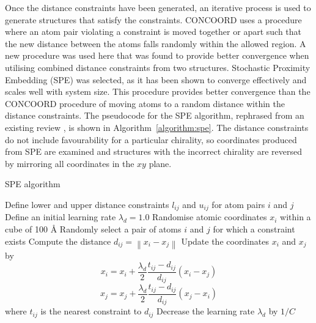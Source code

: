 Once the distance constraints have been generated, an iterative process is used to generate structures that satisfy the constraints.
CONCOORD uses a procedure where an atom pair violating a constraint is moved together or apart such that the new distance between the atoms falls randomly within the allowed region.
A new procedure was used here that was found to provide better convergence when utilising combined distance constraints from two structures.
Stochastic Proximity Embedding (SPE) \cite{Agrafiotis2013} was selected, as it has been shown to converge effectively and scales well with system size.
This procedure provides better convergence than the CONCOORD procedure of moving atoms to a random distance within the distance constraints.
The pseudocode for the SPE algorithm, rephrased from an existing review \cite{Agrafiotis2013}, is shown in Algorithm~\ref{algorithm:spe}.
The distance constraints do not include favourability for a particular chirality, so coordinates produced from SPE are examined and structures with the incorrect chirality are reversed by mirroring all coordinates in the $xy$ plane.


\begin{algorithm}[p]
\caption{SPE algorithm}
\label{algorithm:spe}
\begin{algorithmic}

\State Define lower and upper distance constraints $l_{ij}$ and $u_{ij}$ for atom pairs $i$ and $j$
\State Define an initial learning rate $\lambda_{d} = 1.0$
\State Randomise atomic coordinates $x_{i}$ within a cube of 100 \AA
{}
        \State Randomly select a pair of atoms $i$ and $j$ for which a constraint exists
        \State Compute the distance $d_{ij} = \left\| x_{i} - x_{j} \right\|$
            \State Update the coordinates $x_{i}$ and $x_{j}$ by
                $$
                x_{i} = x_{i} + \frac{\lambda_{d}}{2} \frac{t_{ij} - d_{ij}}{d_{ij}} (x_{i} - x_{j})
                $$
                $$
                x_{j} = x_{j} + \frac{\lambda_{d}}{2} \frac{t_{ij} - d_{ij}}{d_{ij}} (x_{j} - x_{i})
                $$
            \State where $t_{ij}$ is the nearest constraint to $d_{ij}$
        \EndIf
    \EndFor
    \State Decrease the learning rate $\lambda_{d}$ by $1 / C$
\EndFor

\end{algorithmic}
\end{algorithm}


